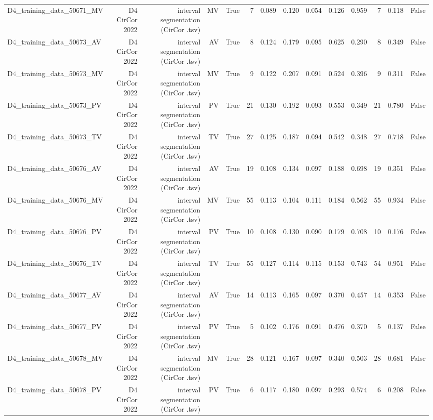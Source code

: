 \begin{table}[htbp]
\begin{tabular}{lrrrrrrrrrrrrr}
    D4\_training\_data\_50671\_MV & D4 CirCor 2022 & interval segmentation (CirCor .tsv) & MV & True & 7 & 0.089 & 0.120 & 0.054 & 0.126 & 0.959 & 7 & 0.118 & False \\
    D4\_training\_data\_50673\_AV & D4 CirCor 2022 & interval segmentation (CirCor .tsv) & AV & True & 8 & 0.124 & 0.179 & 0.095 & 0.625 & 0.290 & 8 & 0.349 & False \\
    D4\_training\_data\_50673\_MV & D4 CirCor 2022 & interval segmentation (CirCor .tsv) & MV & True & 9 & 0.122 & 0.207 & 0.091 & 0.524 & 0.396 & 9 & 0.311 & False \\
    D4\_training\_data\_50673\_PV & D4 CirCor 2022 & interval segmentation (CirCor .tsv) & PV & True & 21 & 0.130 & 0.192 & 0.093 & 0.553 & 0.349 & 21 & 0.780 & False \\
    D4\_training\_data\_50673\_TV & D4 CirCor 2022 & interval segmentation (CirCor .tsv) & TV & True & 27 & 0.125 & 0.187 & 0.094 & 0.542 & 0.348 & 27 & 0.718 & False \\
    D4\_training\_data\_50676\_AV & D4 CirCor 2022 & interval segmentation (CirCor .tsv) & AV & True & 19 & 0.108 & 0.134 & 0.097 & 0.188 & 0.698 & 19 & 0.351 & False \\
    D4\_training\_data\_50676\_MV & D4 CirCor 2022 & interval segmentation (CirCor .tsv) & MV & True & 55 & 0.113 & 0.104 & 0.111 & 0.184 & 0.562 & 55 & 0.934 & False \\
    D4\_training\_data\_50676\_PV & D4 CirCor 2022 & interval segmentation (CirCor .tsv) & PV & True & 10 & 0.108 & 0.130 & 0.090 & 0.179 & 0.708 & 10 & 0.176 & False \\
    D4\_training\_data\_50676\_TV & D4 CirCor 2022 & interval segmentation (CirCor .tsv) & TV & True & 55 & 0.127 & 0.114 & 0.115 & 0.153 & 0.743 & 54 & 0.951 & False \\
    D4\_training\_data\_50677\_AV & D4 CirCor 2022 & interval segmentation (CirCor .tsv) & AV & True & 14 & 0.113 & 0.165 & 0.097 & 0.370 & 0.457 & 14 & 0.353 & False \\
    D4\_training\_data\_50677\_PV & D4 CirCor 2022 & interval segmentation (CirCor .tsv) & PV & True & 5 & 0.102 & 0.176 & 0.091 & 0.476 & 0.370 & 5 & 0.137 & False \\
    D4\_training\_data\_50678\_MV & D4 CirCor 2022 & interval segmentation (CirCor .tsv) & MV & True & 28 & 0.121 & 0.167 & 0.097 & 0.340 & 0.503 & 28 & 0.681 & False \\
    D4\_training\_data\_50678\_PV & D4 CirCor 2022 & interval segmentation (CirCor .tsv) & PV & True & 6 & 0.117 & 0.180 & 0.097 & 0.293 & 0.574 & 6 & 0.208 & False \\

\end{tabular}
\end{table}
